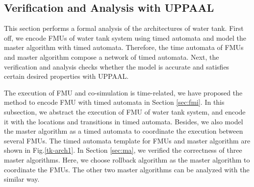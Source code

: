 \subsection{Verification and Analysis with UPPAAL}
\label{sec:mauppaal}
This section performs a formal analysis of the architectures of water tank. First off, we encode FMUs of water tank system using timed automata and model the master algorithm with timed automata. Therefore, the time automata of FMUs and master algorithm compose a network of timed automata. Next, the verification and analysis checks whether the model is accurate and satisfies certain desired properties with UPPAAL. 

The execution of FMU and co-simulation is time-related, we have proposed the method to encode FMU with timed automata in Section \ref{sec:fmi}. In this subsection, we abstract the execution of FMU of water tank system, and encode it with the locations and transitions in timed automata. Besides, we also model the master algorithm as a timed automata to coordinate the execution between several FMUs. The timed automata template for FMUs and master algorithm are shown in Fig.\ref{tk-arch1}. In Section \ref{sec:ma}, we verified the correctness of three master algorithms. Here, we choose rollback algorithm as the master algorithm to coordinate the FMUs. The other two master algorithms can be analyzed with the similar way. 

